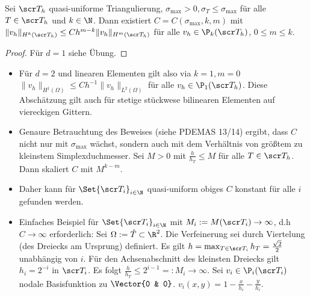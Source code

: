 \begin{st} \label{3.81}
	Sei $\scr T_h$ quasi-uniforme Triangulierung, $\sigma_{\text{max}} > 0, \sigma_T \le \sigma_{\text{max}}$ für alle $T \in \scr T_h$ und $k \in \N$.
	Dann existiert $C = C(\sigma_{\text{max}}, k, m)$ mit
	\begin{math}
		\|v_h\|_{H^k(\scr T_h)} \le C h^{m-k} \|v_h\|_{H^m(\scr T_h)}
	\end{math}
	für alle $v_h \in \P_k(\scr T_h)$, $0 \le m \le k$.
	\begin{proof}
		Für $d = 1$ siehe Übung.
	\end{proof}
	\begin{note}
		\begin{itemize}
			\item
				Für $d = 2$ und linearen Elementen gilt also via $k = 1, m = 0$
				\begin{math}
					\|v_h\|_{H^1(\Omega)}
					\le C h^{-1} \|v_h\|_{L^2(\Omega)}
				\end{math}
				für alle $v_h \in \P_1(\scr T_h)$.
				Diese Abschätzung gilt auch für stetige stückwese bilinearen Elementen auf viereckigen Gittern.
			\item
				Genaure Betrauchtung des Beweises (siehe PDEMAS 13/14) ergibt, dass $C$ nicht nur mit $\sigma_{\text{max}}$ wächst, sondern auch mit dem Verhältnis von größtem zu kleinstem Simplexduchmesser.
				Sei $M > 0$ mit $\frac{h}{h_T} \le M$ für alle $T \in \scr T_h$.
				Dann skaliert $C$ mit $M^{k-m}$.
			\item
				Daher kann für $\Set{\scr T_i}_{i\in \N}$ quasi-uniform obiges $C$ konstant für alle $i$ gefunden werden.
			\item
				Einfaches Beispiel für $\Set{\scr T_i}_{i\in\N}$ mit $M_i := M(\scr T_i) \to \infty$, d.h $C \to \infty$ erforderlich:
				Sei $\Omega := \hat T \subset \R^2$.
				Die Verfeinerung sei durch Viertelung (des Dreiecks am Ursprung) definiert.
				Es gilt
				\begin{math}
					h = \max_{T \in \scr T_i} h_T = \frac{\sqrt 2}{2}
				\end{math}
				unabhängig von $i$.
				Für den Achsenabschnitt des kleinsten Dreiecks gilt $h_i = 2^{-i}$ in $\scr T_i$.
				Es folgt
				\begin{math}
					\frac{h}{h_T} \le 2^{i-1} =: M_i \to \infty.
				\end{math}
				Sei $v_i \in \P_i(\scr T_i)$ nodale Basisfunktion zu $\Vector{0 & 0}$.
				\begin{math}
					v_i(x,y) = 1 - \frac{x}{h_i} - \frac{y}{h_i}.

\end{math}
\end{itemize}
\end{note}
\end{st}
